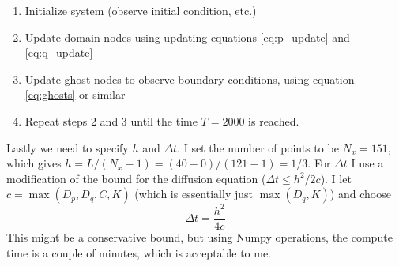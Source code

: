 \documentclass[a4paper,10pt]{article}
\begin{document}
	\begin{enumerate}
		\item Initialize system (observe initial condition, etc.)
		\item Update domain nodes using updating equations \ref{eq:p_update} and \ref{eq:q_update}
		\item Update ghost nodes to observe boundary conditions, using equation \ref{eq:ghosts} or similar
		\item Repeat steps 2 and 3 until the time $ T=2000 $ is reached.
	\end{enumerate}
	Lastly we need to specify $ h $ and $ \Delta t $. I set the number of points to be $ N_x=151 $, which gives $ h = L/(N_x-1) = (40-0)/(121-1) =  1/3 $. For $ \Delta t $ I use a modification of the bound for the diffusion equation ($ \Delta t \leq h^2/2c $). I let $ c = \max (D_p, D_q, C, K) $ (which is essentially just $ \max(D_q, K) $) and choose
	\begin{equation}\label{key}
		\Delta t = \frac{h^2}{4c}
	\end{equation}
	This might be a conservative bound, but using Numpy operations, the compute time is a couple of minutes, which is acceptable to me.
	
\end{document}

